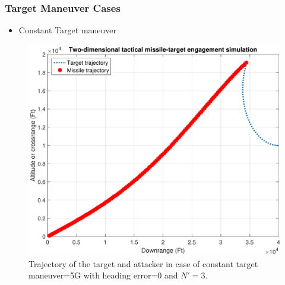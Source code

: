 \documentclass{beamer}
\begin{document}
\begin{frame}
\frametitle{Target Maneuver Cases}
\begin{itemize}
	\item Constant Target maneuver
\end{itemize}
\begin{figure}[htb]
	\centering
	\includegraphics[scale = 0.3]{fig/trajectoryXNT5HE0N3.pdf}
	\caption{Trajectory of the target and attacker in case of constant target maneuver=5G with heading error=0 and $N'=3$.}
	\label{trajectory0NN3}
\end{figure}
\end{frame}
\end{document}
